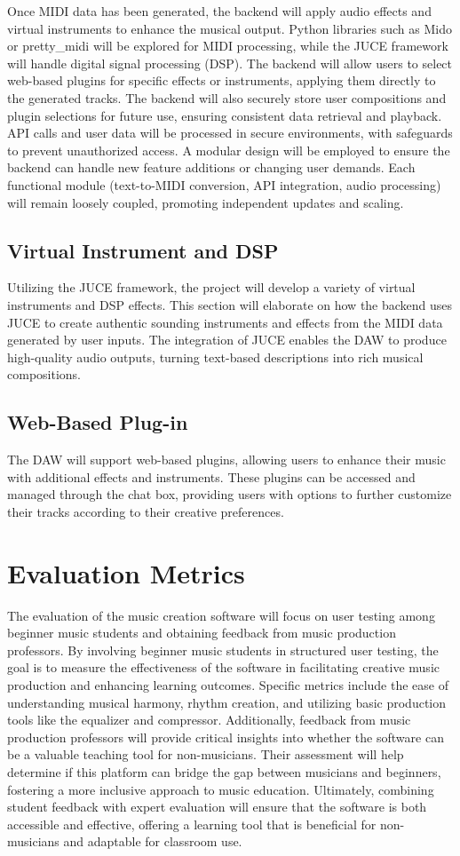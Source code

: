 \documentclass[10pt,twocolumn]{article}
\begin{document}
Once MIDI data has been generated, the backend will apply audio effects and virtual instruments to enhance the musical output. Python libraries such as Mido or pretty\_midi will be explored for MIDI processing, while the JUCE framework will handle digital signal processing (DSP). The backend will allow users to select web-based plugins for specific effects or instruments, applying them directly to the generated tracks. The backend will also securely store user compositions and plugin selections for future use, ensuring consistent data retrieval and playback. API calls and user data will be processed in secure environments, with safeguards to prevent unauthorized access. A modular design will be employed to ensure the backend can handle new feature additions or changing user demands. Each functional module (text-to-MIDI conversion, API integration, audio processing) will remain loosely coupled, promoting independent updates and scaling.

\subsection{Virtual Instrument and DSP}
Utilizing the JUCE framework, the project will develop a variety of virtual instruments and DSP effects. This section will elaborate on how the backend uses JUCE to create authentic sounding instruments and effects from the MIDI data generated by user inputs. The integration of JUCE enables the DAW to produce high-quality audio outputs, turning text-based descriptions into rich musical compositions.
\subsection{Web-Based Plug-in}
The DAW will support web-based plugins, allowing users to enhance their music with additional effects and instruments. These plugins can be accessed and managed through the chat box, providing users with options to further customize their tracks according to their creative preferences.
\section{Evaluation Metrics}
The evaluation of the music creation software will focus on user testing among beginner music students and obtaining feedback from music production professors. By involving beginner music students in structured user testing, the goal is to measure the effectiveness of the software in facilitating creative music production and enhancing learning outcomes. Specific metrics include the ease of understanding musical harmony, rhythm creation, and utilizing basic production tools like the equalizer and compressor. Additionally, feedback from music production professors will provide critical insights into whether the software can be a valuable teaching tool for non-musicians. Their assessment will help determine if this platform can bridge the gap between musicians and beginners, fostering a more inclusive approach to music education. Ultimately, combining student feedback with expert evaluation will ensure that the software is both accessible and effective, offering a learning tool that is beneficial for non-musicians and adaptable for classroom use.
\end{document}
